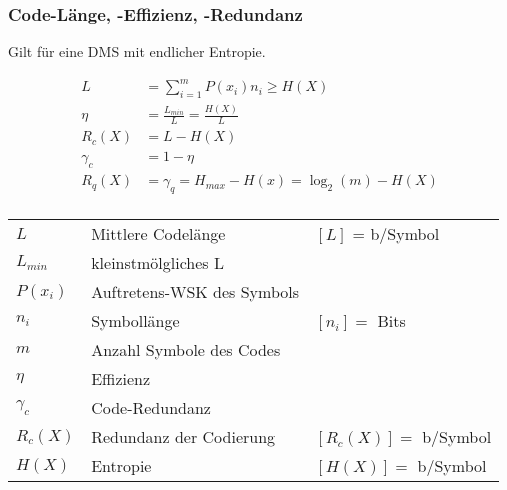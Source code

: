 \subsubsection{Code-Länge, -Effizienz, -Redundanz }
Gilt für eine DMS mit endlicher Entropie.
\begin{multicols}{2}
	\abovedisplayskip=-15pt %
	\begin{align*}
		L 		 &= \sum\limits_{i=1}^m P(x_i) n_i \geq H(X)\\
		\eta	 & = \frac{L_{min}}{L} = \frac{H(X)}{L}  \\
		R_c(X) &  = L - H(X) \\
		\gamma_c &  = 1-\eta \\
		R_q(X)	 &= \gamma_q = H_{max} - H(x) = \log_2(m) - H(X) \\
	\end{align*}
	
	\begin{tabular}{lll}
		$L$ 		& Mittlere Codelänge & $[L]$ = b/Symbol \\
		$L_{min}$ 	& kleinstmölgliches L &  \\
		$P(x_i)$	& Auftretens-WSK des Symbols \\
		$n_i$ 		& Symbollänge & $[n_i] = $ Bits \\
		$m$ 		& Anzahl Symbole des Codes \\
		$\eta$ 		& Effizienz \\
		$\gamma_c$  & Code-Redundanz  & \\
		$R_c(X)$    & Redundanz der Codierung & $[R_c(X)] = $ b/Symbol\\
		$H(X)$ 		& Entropie &  $[H(X)] = $ b/Symbol 
	\end{tabular}
\end{multicols}

